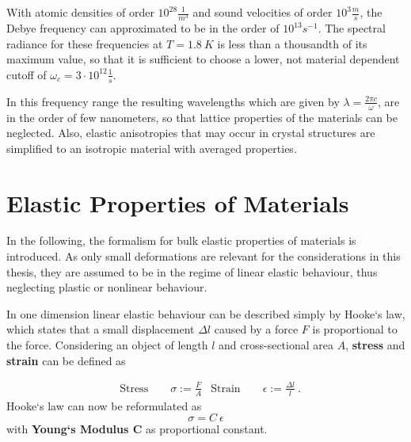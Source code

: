 With atomic densities
of order $10^{28}\si{\frac{1}{m^3}}$ and sound velocities of order
$10^3\si{\frac{m}{s}}$, the Debye frequency can approximated to be in
the order of $10^{13}\si{s^{-1}}$. The spectral radiance for these frequencies
at $T=1.8\ \si{K}$ is less than a thousandth of its maximum value, so that it
is
sufficient to choose a lower, not material dependent
cutoff of $\omega_c=3\cdot 10^{12}\si{\frac{1}{s}}$.

In this frequency range the resulting wavelengths which are given by
$\lambda= \frac{2\pi c}{\omega}$, are in the order of few nanometers, so that
lattice properties of the materials can be neglected. Also, elastic
anisotropies that may occur in crystal structures are simplified to an
isotropic material with averaged properties.

\section{Elastic Properties of Materials}
In the following, the formalism for bulk elastic properties of materials is
introduced. As only small deformations are relevant for the considerations in
this thesis, they are assumed to be in the regime of linear elastic behaviour,
thus neglecting plastic or nonlinear behaviour.

In one dimension linear elastic behaviour can be described simply
by Hooke`s law, which states that a small displacement $\Delta l$ caused by a
force $F$ is proportional to the force.
Considering an object of length $l$ and cross-sectional area $A$,
\textbf{stress} and \textbf{strain} can be defined as

\begin{align}
     & \text{Stress} \quad \quad \sigma := \frac{F}{A}
     & \text{Strain} \quad \quad \epsilon := \frac{\Delta l}{l} \ .
\end{align}
Hooke`s law can now be reformulated as
\begin{equation}
    \label{eq:HookStress1D}
    \sigma = C\ \epsilon
\end{equation}
with \textbf{Young`s Modulus C} as proportional constant.

